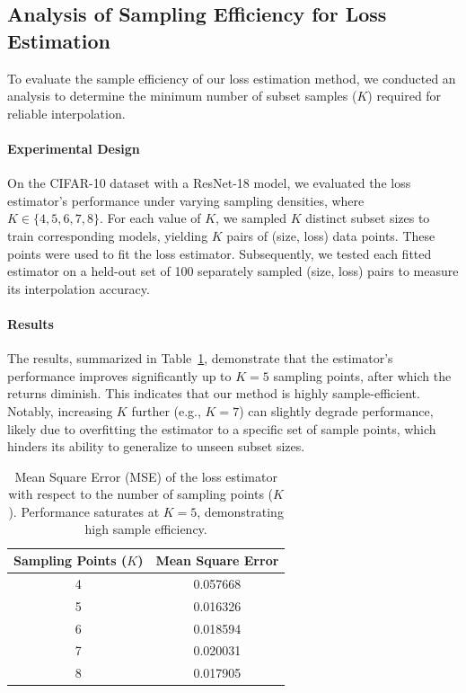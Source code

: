 \subsection{Analysis of Sampling Efficiency for Loss Estimation}
\label{appendix:sampling_efficiency}

To evaluate the sample efficiency of our loss estimation method, we conducted an analysis to determine the minimum number of subset samples (\(K\)) required for reliable interpolation.

\paragraph{Experimental Design}
On the CIFAR-10 dataset with a ResNet-18 model, we evaluated the loss estimator's performance under varying sampling densities, where \(K \in \{4, 5, 6, 7, 8\}\). For each value of \(K\), we sampled \(K\) distinct subset sizes to train corresponding models, yielding \(K\) pairs of (size, loss) data points. These points were used to fit the loss estimator. Subsequently, we tested each fitted estimator on a held-out set of 100 separately sampled (size, loss) pairs to measure its interpolation accuracy.

\paragraph{Results}
The results, summarized in Table~\ref{tab:sampling_efficiency_mse}, demonstrate that the estimator's performance improves significantly up to \(K=5\) sampling points, after which the returns diminish. This indicates that our method is highly sample-efficient. Notably, increasing \(K\) further (e.g., \(K=7\)) can slightly degrade performance, likely due to overfitting the estimator to a specific set of sample points, which hinders its ability to generalize to unseen subset sizes.

\begin{table}[h]
\centering
\caption{Mean Square Error (MSE) of the loss estimator with respect to the number of sampling points (\(K\)). Performance saturates at \(K=5\), demonstrating high sample efficiency.}
\label{tab:sampling_efficiency_mse}
\begin{tabular}{cc}
\toprule
\textbf{Sampling Points (\(K\))} & \textbf{Mean Square Error} \\
\midrule
4 & 0.057668 \\
5 & 0.016326 \\
6 & 0.018594 \\
7 & 0.020031 \\
8 & 0.017905 \\
\bottomrule
\end{tabular}
\end{table}

